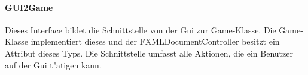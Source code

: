 \paragraph{GUI2Game}
\label{par:gui2Game}
Dieses Interface bildet die Schnittstelle von der Gui zur Game-Klasse. Die Game-Klasse implementiert dieses und der FXMLDocumentController besitzt ein Attribut dieses Typs. Die Schnittstelle umfasst alle Aktionen, die ein Benutzer auf der Gui t"atigen kann. 